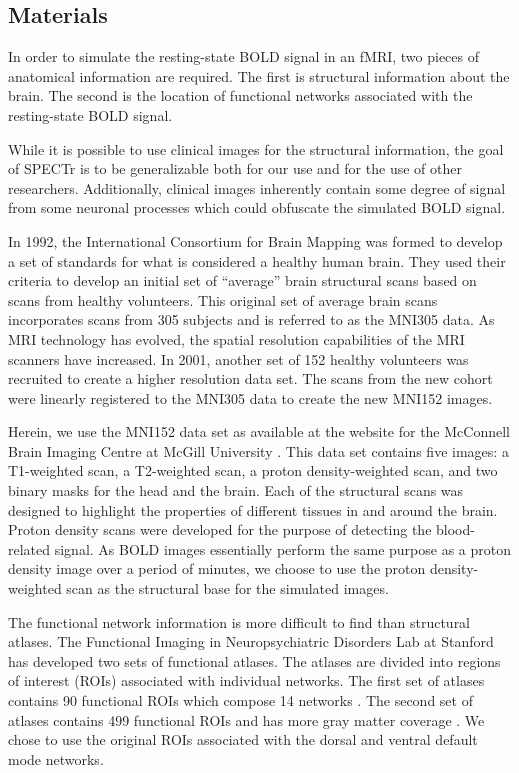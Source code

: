 \subsection{Materials}

In order to simulate the resting-state BOLD signal in an fMRI, two pieces of anatomical information are required. The first is structural information about the brain. The second is the location of functional networks associated with the resting-state BOLD signal.

While it is possible to use clinical images for the structural information, the goal of SPECTr is to be generalizable both for our use and for the use of other researchers. Additionally, clinical images inherently contain some degree of signal from some neuronal processes which could obfuscate the simulated BOLD signal. 

In 1992, the International Consortium for Brain Mapping was formed to develop a set of standards for what is considered a healthy human brain. They used their criteria to develop an initial set of ``average'' brain structural scans based on scans from healthy volunteers. This original set of average brain scans incorporates scans from 305 subjects and is referred to as the MNI305 data. As MRI technology has evolved, the spatial resolution capabilities of the MRI scanners have increased. In 2001, another set of 152 healthy volunteers was recruited to create a higher resolution data set. The scans from the new cohort were linearly registered to the MNI305 data to create the new MNI152 images. %

Herein, we use the MNI152 data set as available at the website for the McConnell Brain Imaging Centre at McGill University \cite{Fonov2009} \cite{Fonov2011}. This data set contains five images: a T1-weighted scan, a T2-weighted scan, a proton density-weighted scan, and two binary masks for the head and the brain. Each of the structural scans was designed to highlight the properties of different tissues in and around the brain. Proton density scans were developed for the purpose of detecting the blood-related signal. As BOLD images essentially perform the same purpose as a proton density image over a period of minutes, we choose to use the proton density-weighted scan as the structural base for the simulated images. 

The functional network information is more difficult to find than structural atlases. The Functional Imaging in Neuropsychiatric Disorders Lab at Stanford has developed two sets of functional atlases. The atlases are divided into regions of interest (ROIs) associated with individual networks. The first set of atlases contains 90 functional ROIs which compose 14 networks \cite{Shirer2012}. The second set of atlases contains 499 functional ROIs and has more gray matter coverage \cite{Altmann2015}. We chose to use the original ROIs associated with the dorsal and ventral default mode networks.

